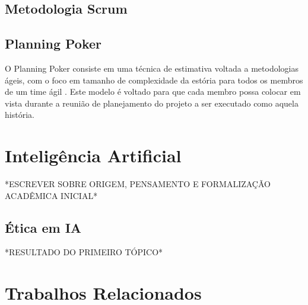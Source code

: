 \subsection{Metodologia Scrum}


\subsection{Planning Poker}

O Planning Poker consiste em uma técnica de estimativa voltada a metodologias ágeis, com o foco em tamanho de complexidade da estória para todos os membros de um time ágil \cite{planningpoker}. Este modelo é voltado para que cada membro possa colocar em vista durante a reunião de planejamento do projeto a ser executado como aquela história\cite{Scrum}. 

\section{Inteligência Artificial}


*ESCREVER SOBRE ORIGEM, PENSAMENTO E FORMALIZAÇÃO ACADÊMICA INICIAL*

\subsection{Ética em IA}

*RESULTADO DO PRIMEIRO TÓPICO*

\section{Trabalhos Relacionados}

